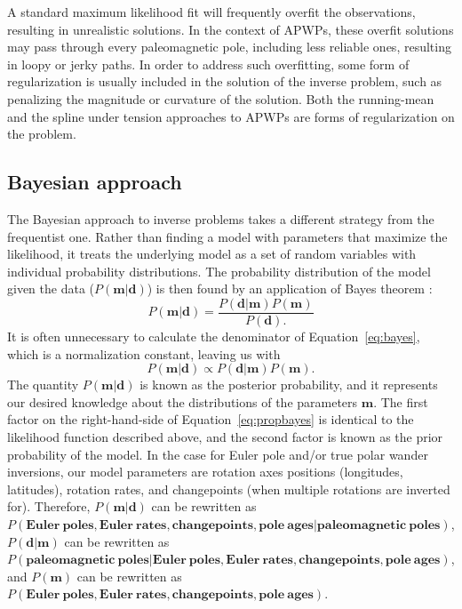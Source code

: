 \documentclass[11pt,letterpaper]{article}
\begin{document}
A standard maximum likelihood fit will frequently overfit the observations, resulting in unrealistic solutions. In the context of APWPs, these overfit solutions may pass through every paleomagnetic pole, including less reliable ones, resulting in loopy or jerky paths. In order to address such overfitting, some form of regularization is usually included in the solution of the inverse problem, such as penalizing the magnitude or curvature of the solution. Both the running-mean and the spline under tension approaches to APWPs are forms of regularization on the problem.

\subsection*{Bayesian approach}

The Bayesian approach to inverse problems takes a different strategy from the frequentist one. Rather than finding a model with parameters that maximize the likelihood, it treats the underlying model as a set of random variables with individual probability distributions. The probability distribution of the model given the data ($P(\mathbf{m} \vert \mathbf{d})$) is then found by an application of Bayes theorem \citep[cf.][]{Sivia2006a}:
\begin{equation}
P\left(\mathbf{m} \vert \mathbf{d} \right) = \frac{ P \left(\mathbf{d}\vert \mathbf{m} \right) P \left( \mathbf{m} \right) }{P \left( \mathbf{d}\right).}
\label{eq:bayes}
\end{equation}
It is often unnecessary to calculate the denominator of Equation~\eqref{eq:bayes}, which is a normalization constant, leaving us with
\begin{equation}
P\left(\mathbf{m} \vert \mathbf{d} \right) \propto P \left( \mathbf{d} \vert \mathbf{m} \right) P \left( \mathbf{m} \right).
\label{eq:propbayes}
\end{equation}
The quantity $P(\mathbf{m} \vert \mathbf{d})$ is known as the posterior probability, and it represents our desired knowledge about the distributions of the parameters $\mathbf{m}$. The first factor on the right-hand-side of Equation~\eqref{eq:propbayes} is identical to the likelihood function described above, and the second factor
is known as the prior probability of the model. In the case for Euler pole and/or true polar wander inversions, our model parameters are rotation axes positions (longitudes, latitudes), rotation rates, and changepoints (when multiple rotations are inverted for). Therefore, $P(\mathbf{m} \vert \mathbf{d})$  can be rewritten as $P\left(\mathbf{Euler\ poles, Euler\ rates, changepoints, pole\ ages} \vert \mathbf{paleomagnetic\ poles} \right)$, $P(\mathbf{d} \vert \mathbf{m})$ can be rewritten as $P \left( \mathbf{paleomagnetic\ poles} \vert \mathbf{Euler\ poles, Euler\ rates, changepoints, pole\ ages} \right)$, and $P(\mathbf{m})$ can be rewritten as $P \left( \mathbf{Euler\ poles, Euler\ rates, changepoints, pole\ ages} \right)$.
\end{document}
